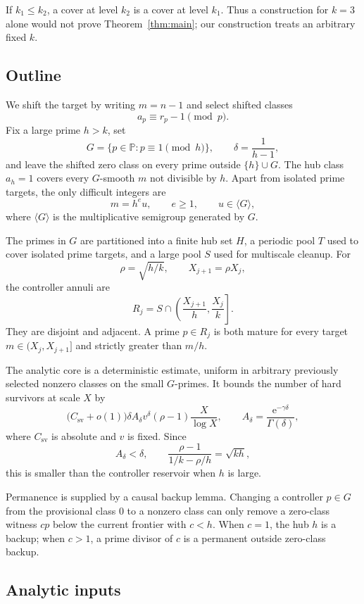 \documentclass[10pt]{amsart}
\numberwithin{equation}{section}
\newcommand{\PP}{\mathbb P}
\newcommand{\Gsem}{\langle G\rangle}
\newcommand{\e}{\mathrm e}
\theoremstyle{remark}
\begin{document}
If \(k_1\le k_2\), a cover at level \(k_2\) is a cover at level \(k_1\).
Thus a construction for \(k=3\) alone would not prove Theorem~\ref{thm:main};
our construction treats an arbitrary fixed \(k\).

\subsection{Outline}

We shift the target by writing \(m=n-1\) and select shifted classes
\[
  a_p\equiv r_p-1\pmod p.
\]
Fix a large prime \(h>k\), set
\[
 G=\{p\in\PP:p\equiv1\pmod h\},
 \qquad
 \delta=\frac1{h-1},
\]
and leave the shifted zero class on every prime outside \(\{h\}\cup G\).
The hub class \(a_h=1\) covers every \(G\)-smooth \(m\) not divisible by
\(h\). Apart from isolated prime targets, the only difficult integers are
\[
 m=h^e u,\qquad e\ge1,\qquad u\in\Gsem,
\]
where \(\Gsem\) is the multiplicative semigroup generated by \(G\).

The primes in \(G\) are partitioned into a finite hub set \(H\), a periodic
pool \(T\) used to cover isolated prime targets, and a large pool \(S\) used
for multiscale cleanup. For
\[
 \rho=\sqrt{h/k},\qquad X_{j+1}=\rho X_j,
\]
the controller annuli are
\[
 R_j=S\cap\left(\frac{X_{j+1}}h,\frac{X_j}k\right].
\]
They are disjoint and adjacent. A prime \(p\in R_j\) is both mature for
every target \(m\in(X_j,X_{j+1}]\) and strictly greater than \(m/h\).

The analytic core is a deterministic estimate, uniform in arbitrary
previously selected nonzero classes on the small \(G\)-primes. It bounds the
number of hard survivors at scale \(X\) by
\[
 \bigl(C_{\mathrm{sv}}+o(1)\bigr)
 \delta A_\delta v^\delta(\rho-1)\frac X{\log X},
 \qquad
 A_\delta=\frac{\e^{-\gamma\delta}}{\Gamma(\delta)},
\]
where \(C_{\mathrm{sv}}\) is absolute and \(v\) is fixed. Since
\[
 A_\delta<\delta,\qquad
 \frac{\rho-1}{1/k-\rho/h}=\sqrt{kh},
\]
this is smaller than the controller reservoir when \(h\) is large.

Permanence is supplied by a causal backup lemma. Changing a controller
\(p\in G\) from the provisional class \(0\) to a nonzero class can only
remove a zero-class witness \(cp\) below the current frontier with \(c<h\).
When \(c=1\), the hub \(h\) is a backup; when \(c>1\), a prime divisor of
\(c\) is a permanent outside zero-class backup.

\subsection{Analytic inputs}
\end{document}
